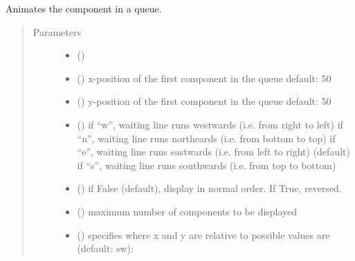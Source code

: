 \documentclass[letterpaper,10pt,english]{sphinxmanual}
\begin{document}
\begin{fulllineitems}
\label{\detokenize{Reference:salabim.AnimateQueue}}
Animates the component in a queue.
\begin{quote}\begin{description}
\item[{Parameters}] \leavevmode\begin{itemize}
\item {} 
 ({\hyperref[\detokenize{Reference:salabim.Queue}]{}}) \textendash{} 

\item {} 
 () \textendash{} x-position of the first component in the queue 
default: 50

\item {} 
 () \textendash{} y-position of the first component in the queue 
default: 50

\item {} 
 () \textendash{} if “w”, waiting line runs westwards (i.e. from right to left) 
if “n”, waiting line runs northeards (i.e. from bottom to top) 
if “e”, waiting line runs eastwards (i.e. from left to right) (default) 
if “s”, waiting line runs southwards (i.e. from top to bottom)

\item {} 
 () \textendash{} if False (default), display in normal order. If True, reversed.

\item {} 
 () \textendash{} maximum number of components to be displayed

\item {} 
 () \textendash{} specifies where x and y are relative to 
possible values are (default: sw): 


\end{itemize}
\end{description}
\end{quote}
\end{fulllineitems}
\end{document}
